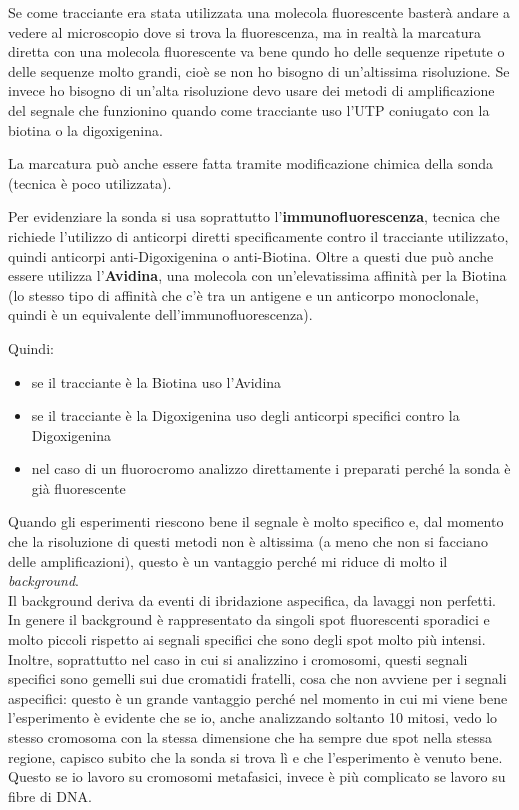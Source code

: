 \documentclass[11pt]{book}
\begin{document}
Se come tracciante era stata utilizzata una molecola fluorescente basterà andare a vedere al microscopio dove si trova la fluorescenza, ma in realtà la marcatura diretta con una molecola fluorescente va bene qundo ho delle sequenze ripetute o delle sequenze molto grandi, cioè se non ho bisogno di un’altissima risoluzione. Se invece ho bisogno di un’alta risoluzione devo usare dei metodi di amplificazione del segnale che funzionino quando come tracciante uso l'UTP coniugato con la biotina o la digoxigenina. 

La marcatura può anche essere fatta tramite modificazione chimica della sonda (tecnica è poco utilizzata). 

Per evidenziare la sonda si usa soprattutto l’\textbf{immunofluorescenza}, tecnica che richiede l'utilizzo di anticorpi diretti specificamente contro il tracciante utilizzato, quindi anticorpi anti-Digoxigenina o anti-Biotina.
Oltre a questi due può anche essere utilizza l’\textbf{Avidina}, una molecola con un’elevatissima affinità per la Biotina (lo stesso tipo di affinità che c’è tra un antigene e un anticorpo monoclonale, quindi è un equivalente dell’immunofluorescenza).

Quindi:
\begin{itemize}
\item se il tracciante è la Biotina uso l’Avidina
\item se il tracciante è la Digoxigenina uso degli anticorpi specifici contro la Digoxigenina
\item nel caso di un fluorocromo analizzo direttamente i preparati perché la sonda è già fluorescente
\end{itemize}

Quando gli esperimenti riescono bene il segnale è molto specifico e, dal momento che la risoluzione di questi metodi non è altissima (a meno che non si facciano delle amplificazioni), questo è un vantaggio perché mi riduce di molto il \emph{background}.\\
Il background deriva da eventi di ibridazione aspecifica, da lavaggi non perfetti. In genere il background è rappresentato da singoli spot fluorescenti sporadici e molto piccoli rispetto ai segnali specifici che sono degli spot molto più intensi.\\
Inoltre, soprattutto nel caso in cui si analizzino i cromosomi, questi segnali specifici sono gemelli sui due cromatidi fratelli, cosa che non avviene per i segnali aspecifici: questo è un grande vantaggio perché nel momento in cui mi viene bene l’esperimento è evidente che se io, anche analizzando soltanto 10 mitosi, vedo lo stesso cromosoma con la stessa dimensione che ha sempre due spot nella stessa regione, capisco subito che la sonda si trova lì e che l’esperimento è venuto bene. Questo se io lavoro su cromosomi metafasici, invece è più complicato se lavoro su fibre di DNA.
\end{document}
